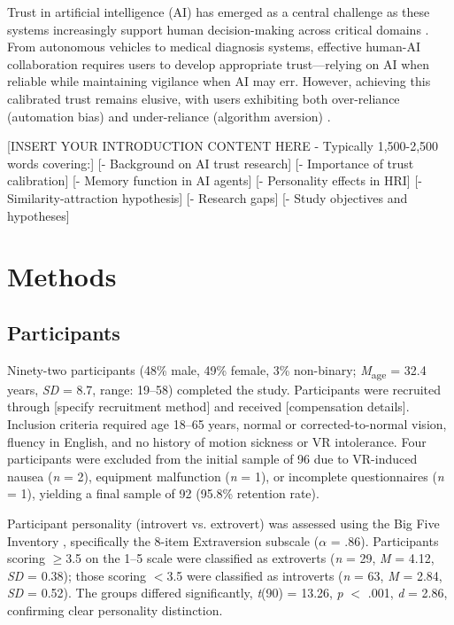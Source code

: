 \documentclass[12pt]{article}
\begin{document}
Trust in artificial intelligence (AI) has emerged as a central challenge as these systems increasingly support human decision-making across critical domains \citep{lee2004trust, schaefer2016meta}. From autonomous vehicles to medical diagnosis systems, effective human-AI collaboration requires users to develop appropriate trust---relying on AI when reliable while maintaining vigilance when AI may err. However, achieving this calibrated trust remains elusive, with users exhibiting both over-reliance (automation bias) and under-reliance (algorithm aversion) \citep{parasuraman1997humans}.

[INSERT YOUR INTRODUCTION CONTENT HERE - Typically 1,500-2,500 words covering:]
[- Background on AI trust research]
[- Importance of trust calibration]
[- Memory function in AI agents]
[- Personality effects in HRI]
[- Similarity-attraction hypothesis]
[- Research gaps]
[- Study objectives and hypotheses]

\section{Methods}

\subsection{Participants}

Ninety-two participants (48\% male, 49\% female, 3\% non-binary; \textit{M}\textsubscript{age} = 32.4 years, \textit{SD} = 8.7, range: 19--58) completed the study. Participants were recruited through [specify recruitment method] and received [compensation details]. Inclusion criteria required age 18--65 years, normal or corrected-to-normal vision, fluency in English, and no history of motion sickness or VR intolerance. Four participants were excluded from the initial sample of 96 due to VR-induced nausea (\textit{n} = 2), equipment malfunction (\textit{n} = 1), or incomplete questionnaires (\textit{n} = 1), yielding a final sample of 92 (95.8\% retention rate).

Participant personality (introvert vs. extrovert) was assessed using the Big Five Inventory \citep{john1991big}, specifically the 8-item Extraversion subscale ($\alpha$ = .86). Participants scoring $\geq$3.5 on the 1--5 scale were classified as extroverts (\textit{n} = 29, \textit{M} = 4.12, \textit{SD} = 0.38); those scoring $<$3.5 were classified as introverts (\textit{n} = 63, \textit{M} = 2.84, \textit{SD} = 0.52). The groups differed significantly, \textit{t}(90) = 13.26, \textit{p} $<$ .001, \textit{d} = 2.86, confirming clear personality distinction.
\end{document}
